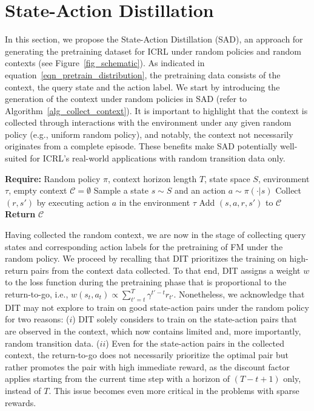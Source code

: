 \documentclass[10pt]{article}
\def\eqref#1{equation~\ref{#1}}
\def\ccalC{{\ensuremath{\mathcal C}}}
\begin{document}
\section{State-Action Distillation}
In this section, we propose the State-Action Distillation (SAD), an approach for generating the pretraining dataset for ICRL under random policies and random contexts (see Figure~\ref{fig_schematic}).
As indicated in \eqref{eqn_pretrain_distribution}, the pretraining data consists of the context, the query state and the action label. We start by introducing the generation of the context under random policies in SAD (refer to Algorithm~\ref{alg_collect_context}).
It is important to highlight that the context is collected through interactions with the environment under any given random policy (e.g., uniform random policy), and notably, the context not necessarily originates from a complete episode.
These benefits make SAD potentially well-suited for ICRL's real-world applications with random transition data only.
\begin{algorithm}
\caption{Collecting Contexts under Random Policy}         \label{alg_collect_context}
\begin{algorithmic}[1]
		\STATE \textbf{Require:} Random policy $\pi$, context horizon length $T$, state space $S$, environment $\tau$, empty context $\ccalC = \emptyset$
            \STATE Sample a state $s \sim S$ and an action $a \sim \pi(\cdot | s)$
            \STATE Collect $(r, s')$ by executing action $a$ in the environment $\tau$
            \STATE Add $(s, a, r, s')$ to $\ccalC$
        \ENDFOR
        \STATE \textbf{Return} $\ccalC$
\end{algorithmic}
\end{algorithm}
Having collected the random context, we are now in the stage of collecting query states and corresponding action labels for the pretraining of FM under the random policy.
We proceed by recalling that DIT prioritizes the training on high-return pairs from the context data collected. To that end, DIT assigns a weight $w$ to the loss function during the pretraining phase that is proportional to the return-to-go, i.e.,
$w(s_t, a_t) \propto \sum_{t'=t}^T \gamma^{t' - t} r_{t'}.$
Nonetheless, we acknowledge that DIT may not explore to train on good state-action pairs under the random policy for two reasons: ($i$) DIT solely considers to train on the state-action pairs that are observed in the context, which now contains limited and, more importantly, random transition data.
($ii$) Even for the state-action pairs in the collected context, the return-to-go does not necessarily prioritize the optimal pair but rather promotes the pair with high immediate reward, as the discount factor applies starting from the current time step with a horizon of $(T-t+1)$ only, instead of $T$. This issue becomes even more critical in the problems with sparse rewards.
\end{document}

